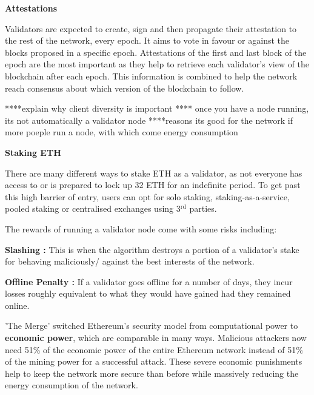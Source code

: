 \textbf{Attestations}

Validators are expected to create, sign and then propagate their attestation to the rest of the network, every epoch. It aims to vote in favour or against the blocks proposed in a specific epoch. Attestations of the first and last block of the epoch are the most important as they help to retrieve each validator's view of the blockchain after each epoch. This information is combined to help the network reach consensus about which version of the blockchain to follow.

 ****explain why client diversity is important
 **** once you have a node running, its not automatically a validator node
****reasons its good for the network if more poeple run a node, with which come energy consumption
 
\textbf{Staking ETH}

There are many different ways to stake ETH as a validator, as not everyone has access to or is prepared to lock up 32 ETH for an indefinite period. To get past this high barrier of entry, users can opt for solo staking, staking-as-a-service, pooled staking or centralised exchanges using 3$\mathrm{^{rd}}$ parties. 

The rewards of running a validator node come with some risks including:
 
\textbf{Slashing :}
This is when the algorithm destroys a portion of a validator's stake for behaving maliciously/ against the best interests of the network.

\textbf{Offline Penalty :}
If a validator goes offline for a number of days, they incur losses roughly equivalent to what they would have gained had they remained online. 

'The Merge' switched Ethereum's security model from computational power to \textbf{economic power}, which are comparable in many ways. Malicious attackers now need 51\% of the economic power of the entire Ethereum network instead of 51\% of the mining power for a successful attack. These severe economic punishments help to keep the network more secure than before while massively reducing the energy consumption of the network. 


